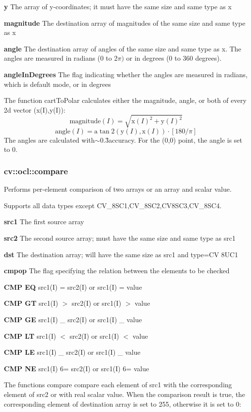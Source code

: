 \documentclass{article}
\begin{document}
\textbf{y }The array of y-coordinates; it must have the same size and same
type as x

\textbf{magnitude }The destination array of magnitudes of the same size and
same type as x

\textbf{angle }The destination array of angles of the same size and same
type as x. The angles are measured in radians (0 to 2$\pi )$ or in degrees
(0 to 360 degrees).

\textbf{angleInDegrees }The flag indicating whether the angles are measured
in radians, which is default mode, or in degrees

The function cartToPolar calculates either the magnitude, angle, or both of
every 2d vector (x(I),y(I)):
\[
\mbox{magnitude}(I)=\sqrt {\mbox{x}(I)^2+\mbox{y}(I)^2}
\]
\[
\mbox{angle}(I)=\mbox{a}\tan 2(\mbox{y}(I),\mbox{x}(I))\cdot [180/\pi ]
\]
The angles are calculated with$\sim $0.3\r{ }accuracy. For the (0,0) point,
the angle is set to 0.

\newpage

\subsubsection{cv::ocl::compare}
\label{subsubsec:mylabel11}
Performs per-element comparison of two arrays or an array and scalar value.

Supports all data types except CV{\_}8SC1,CV{\_}8SC2,CV8SC3,CV{\_}8SC4.

\textbf{src1 }The first source array

\textbf{src2 }The second source array; must have the same size and same type
as src1

\textbf{dst }The destination array; will have the same size as src1 and
type=CV 8UC1

\textbf{cmpop }The flag specifying the relation between the elements to be
checked

\textbf{CMP EQ }src1(I) = src2(I) or src1(I) = value

\textbf{CMP GT }src1(I) $>$ src2(I) or src1(I) $>$ value

\textbf{CMP GE }src1(I) {\_} src2(I) or src1(I) {\_} value

\textbf{CMP LT }src1(I) $<$ src2(I) or src1(I) $<$ value

\textbf{CMP LE }src1(I) {\_} src2(I) or src1(I) {\_} value

\textbf{CMP NE }src1(I) 6= src2(I) or src1(I) 6= value

The functions compare compare each element of src1 with the corresponding
element of src2 or with real scalar value. When the comparison result is
true, the corresponding element of destination array is set to 255,
otherwise it is set to 0:
\end{document}

